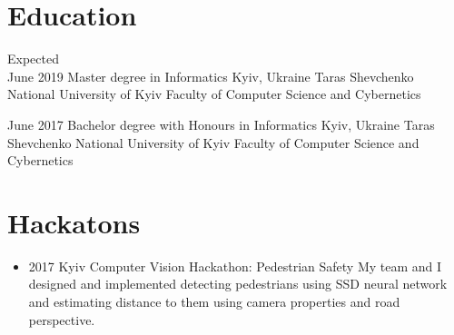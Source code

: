 \documentclass[letterpaper]{twentysecondcv} %
\begin{document}
\makeprofile %

\section{Education}

\begin{twenty} %
	\twentyitem
    	{Expected \\ June 2019}
        {Master degree in Informatics}
        {Kyiv, Ukraine}
        {Taras Shevchenko National University of Kyiv}
        {Faculty of Computer Science and Cybernetics}
        
	\twentyitem
    	{June 2017}
        {Bachelor degree with Honours in Informatics}
        {Kyiv, Ukraine}
        {Taras Shevchenko National University of Kyiv}
        {Faculty of Computer Science and Cybernetics}
        
\end{twenty}


\section{Hackatons}
\begin{itemize}
    \item \projectItem
        {2017 Kyiv Computer Vision Hackathon: Pedestrian Safety }
        {My team and I designed and implemented detecting pedestrians using SSD neural network and estimating distance to them using camera properties and road perspective.}
\end{itemize}



\end{document}
